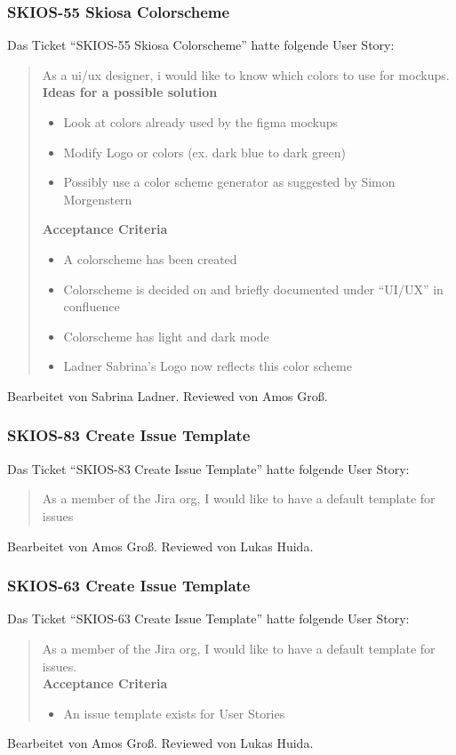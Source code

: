 \subsubsection{SKIOS-55 Skiosa Colorscheme}
Das Ticket \enquote{SKIOS-55 Skiosa Colorscheme} hatte folgende User Story:
\begin{quotation}
    As a ui/ux designer, i would like to know which colors to use for mockups. \\
    \textbf{Ideas for a possible solution}
    \begin{itemize}
    \item Look at colors already used by the figma mockups 
    \item Modify Logo or colors (ex. dark blue to dark green)
    \item Possibly use a color scheme generator as suggested by Simon Morgenstern
    \end{itemize}
    \textbf{Acceptance Criteria}
    \begin{itemize}
    \item A colorscheme has been created
    \item Colorscheme is decided on and briefly documented under “UI/UX” in confluence
    \item Colorscheme has light and dark mode
    \item Ladner Sabrina's Logo now reflects this color scheme
    \end{itemize}
\end{quotation}
Bearbeitet von Sabrina Ladner.
Reviewed von Amos Groß.

\subsubsection{SKIOS-83 Create Issue Template}
Das Ticket \enquote{SKIOS-83 Create Issue Template} hatte folgende User Story:
\begin{quotation}
    As a member of the Jira org, I would like to have a default template for issues
\end{quotation}
Bearbeitet von Amos Groß.
Reviewed von Lukas Huida.

\subsubsection{SKIOS-63 Create Issue Template}
Das Ticket \enquote{SKIOS-63 Create Issue Template} hatte folgende User Story:
\begin{quotation}
    As a member of the Jira org, I would like to have a default template for issues. \\
\textbf{Acceptance Criteria}
\begin{itemize}
    \item An issue template exists for User Stories
\end{itemize}
\end{quotation}
Bearbeitet von Amos Groß.
Reviewed von Lukas Huida.


